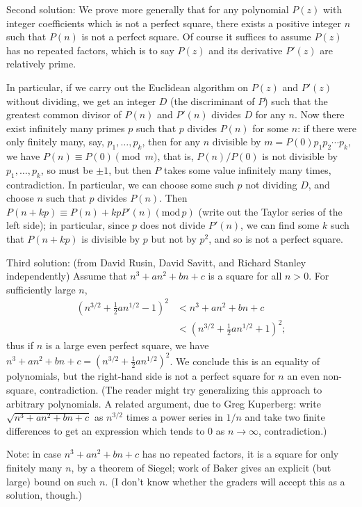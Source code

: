 \documentclass[amssymb,twocolumn,pra,10pt,aps]{revtex4-1}
\begin{document}
\begin{itemize}
Second solution:
We prove more generally that for any polynomial $P(z)$ with integer
coefficients which is not a perfect square, there exists a positive
integer $n$ such that $P(n)$ is not a perfect square. Of course it
suffices to assume $P(z)$ has no repeated factors, which is to say $P(z)$
and its derivative $P'(z)$ are relatively prime.

In particular, if we carry out the Euclidean algorithm on $P(z)$ and $P'(z)$
without dividing, we get an integer $D$ (the discriminant of $P$) such that
the greatest common divisor of $P(n)$ and $P'(n)$ divides $D$ for any $n$.
Now there exist infinitely many primes $p$ such that $p$ divides $P(n)$ for
some $n$: if there were only finitely many, say, $p_1, \dots, p_k$, then
for any $n$ divisible by $m = P(0) p_1 p_2 \cdots p_k$, we have $P(n)
\equiv P(0) \pmod{m}$, that is, $P(n)/P(0)$ is not divisible by $p_1,
\dots, p_k$, so must be $\pm 1$, but then $P$ takes some value infinitely
many times, contradiction. In particular, we can choose some such $p$ not
dividing $D$, and choose $n$ such that $p$ divides $P(n)$. Then $P(n+kp)
\equiv P(n) + kp P'(n) (\mathrm{mod}\,p)$
(write out the Taylor series of the left side);
in particular, since $p$ does not divide $P'(n)$, we can find some $k$
such that $P(n+kp)$ is divisible by $p$ but not by $p^2$, and so
is not a perfect square.

Third solution: (from David Rusin, David Savitt, and Richard Stanley
independently)
Assume that $n^{3}+an^{2}+bn+c$ is a square for all $n>0$.
For sufficiently large $n$,
\begin{align*}
(n^{3/2} + \frac{1}{2} an^{1/2} - 1)^{2} &< n^{3} + an^{2}+bn+c \\
&<  (n^{3/2}+ \frac{1}{2} an^{1/2}+1)^{2};
\end{align*}
thus if $n$ is a large even perfect square, we have $n^{3}+an^{2}+bn+c =
(n^{3/2} + \frac{1}{2} an^{1/2})^{2}$. We conclude this is an
equality of polynomials, but the right-hand side
is not a perfect square for $n$ an even non-square, contradiction.
(The reader might try generalizing this approach to arbitrary polynomials.
A related argument, due to Greg Kuperberg: write $\sqrt{n^3+an^2+bn+c}$
as $n^{3/2}$ times a power series in $1/n$ and take two finite differences
to get an expression which tends to 0 as $n \to \infty$, contradiction.)

Note: in case $n^3 + an^2 + bn + c$ has no repeated factors, it is a
square for only finitely many $n$, by a theorem of Siegel; work of Baker gives
an explicit (but large) bound on such $n$. (I don't know whether the graders
will accept this as a solution, though.)

\end{itemize}
\end{document}
